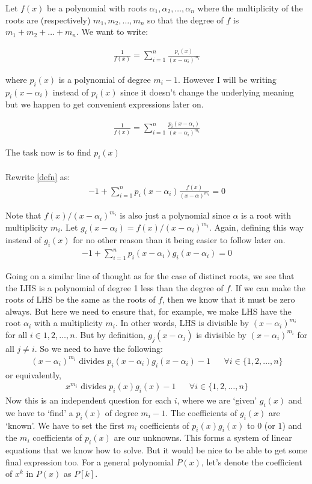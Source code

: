 \documentclass{article}
\begin{document}
Let $f(x)$ be a polynomial with roots $\alpha_1, \alpha_2,\dots, \alpha_n$ where the multiplicity of the roots are (respectively) $m_1, m_2, \dots, m_n$ so that the degree of $f$ is $m_1+m_2+\dots + m_n$. We want to write:

\begin{align}
    \frac{1}{f(x)} = \sum_{i=1}^{n} \frac{p_i(x)}{(x-\alpha_i)^{m_i}}
\end{align}

where $p_i(x)$ is a polynomial of degree $m_i - 1$. However I will be writing $p_i(x-\alpha_i)$ instead of $p_i(x)$ since it doesn't change the underlying meaning but we happen to get convenient expressions later on.

\begin{align}
    \frac{1}{f(x)} = \sum_{i=1}^{n} \frac{p_i(x-\alpha_i)}{(x-\alpha_i)^{m_i}} \label{defn}
\end{align}

The task now is to find $p_i(x)$
\\\\
Rewrite \eqref{defn} as:
\begin{align}
    -1 + \sum_{i=1}^{n}p_i(x-\alpha_i)\frac{f(x)}{(x-\alpha)^{m_i}} = 0
\end{align}

Note that $f(x)/(x-\alpha_i)^{m_i}$ is also just a polynomial since $\alpha$ is a root with multiplicity $m_i$. Let $g_i(x-\alpha_i) = f(x)/(x-\alpha_i)^{m_i}$. Again, defining this way instead of $g_i(x)$ for no other reason than it being easier to follow later on.
\begin{align}
    -1 + \sum_{i=1}^{n}p_i(x-\alpha_i)g_i(x-\alpha_i) = 0
\end{align}

Going on a similar line of thought as for the case of distinct roots, we see that the LHS is a polynomial of degree 1 less than the degree of $f$. If we can make the roots of LHS be the same as the roots of $f$, then we know that it must be zero always. But here we need to ensure that, for example, we make LHS have the root $\alpha_i$ with a multiplicity $m_i$. In other words, LHS is divisible by $(x-\alpha_i)^{m_i}$ for all $i \in {1,2,\dots,n}$. But by definition, $g_j(x-\alpha_j)$ is divisible by $(x-\alpha_i)^{m_i}$ for all $j \neq i$. So we need to have the following:
\begin{align}
    (x-\alpha_i)^{m_i} \textrm{ divides } p_i(x-\alpha_i)g_i(x-\alpha_i) - 1 && \forall i \in \{1,2,\dots,n\}
\end{align}
or equivalently,
\begin{align}
    x^{m_i} \textrm{ divides } p_i(x)g_i(x) - 1 && \forall i \in \{1,2,\dots,n\}
\end{align}
Now this is an independent question for each $i$, where we are `given' $g_i(x)$ and we have to `find' a $p_i(x)$ of degree $m_i - 1$. The coefficients of $g_i(x)$ are `known'. We have to set the first $m_i$ coefficients of $p_i(x)g_i(x)$ to $0$ (or $1$) and the $m_i$ coefficients of $p_i(x)$ are our unknowns. This forms a system of linear equations that we know how to solve. But it would be nice to be able to get some final expression too. For a general polynomial $P(x)$, let's denote the coefficient of $x^k$ in $P(x)$ as $P[k]$.
\end{document}
